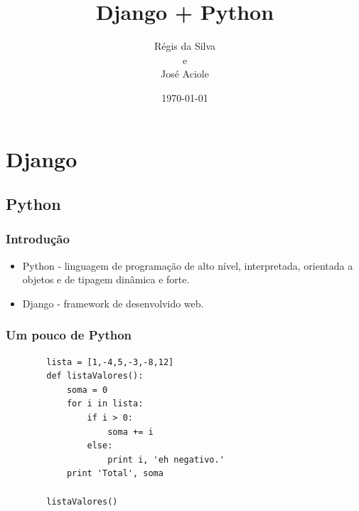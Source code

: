 \documentclass[aspectratio=169]{beamer}
\title[\sc{Django}]{Django + Python}
\author{R\'egis da Silva\\ e\\ Jos\'e Aciole}
\institute{SENAC}
\date{\today}
\begin{document}
\justifying %

{%


  \begin{frame}
	\titlepage
  \end{frame}
}

\section{Django}

\subsection{Python}

\begin{frame}\frametitle{Introdu\c c\~ao}
	\begin{itemize}
		\item Python - linguagem de programa\c c\~ao de alto n\'ivel, interpretada, orientada a objetos e de tipagem din\^amica e forte.
		\item Django - framework de desenvolvido web.
	\end{itemize}
\end{frame}

\begin{frame}[fragile]\frametitle{Um pouco de Python}
	\begin{verbatim}
		lista = [1,-4,5,-3,-8,12]
 		def listaValores():
    		soma = 0
    		for i in lista:
        		if i > 0:
            		soma += i
        		else:
            		print i, 'eh negativo.'
    		print 'Total', soma
		 
		listaValores()
	\end{verbatim}
\end{frame}

		 
\end{document}
